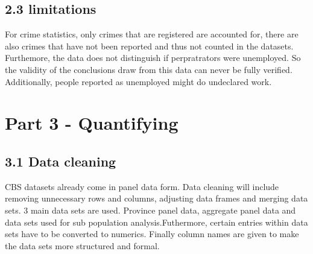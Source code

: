 \documentclass[
]{article}
\begin{document}
\subsection{2.3 limitations}\label{limitations}

For crime statistics, only crimes that are registered are accounted for,
there are also crimes that have not been reported and thus not counted
in the datasets. Furthemore, the data does not distinguish if
perpratrators were unemployed. So the validity of the conclusions draw
from this data can never be fully verified. Additionally, people
reported as unemployed might do undeclared work.

\section{Part 3 - Quantifying}\label{part-3---quantifying}

\subsection{3.1 Data cleaning}\label{data-cleaning}

CBS datasets already come in panel data form. Data cleaning will include
removing unnecessary rows and columns, adjusting data frames and merging
data sets. 3 main data sets are used. Province panel data, aggregate
panel data and data sets used for sub population analysis.Futhermore,
certain entries within data sets have to be converted to numerics.
Finally column names are given to make the data sets more structured and
formal.
\end{document}
